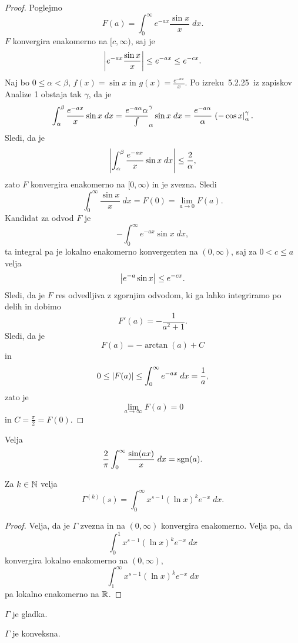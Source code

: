 \begin{proof}
Poglejmo
\[
F(a) = \int_0^\infty e^{-ax} \frac{\sin x}{x}\;dx.
\]
$F$ konvergira enakomerno na $[c,\infty)$, saj je
\[
\left\lvert e^{-ax} \frac{\sin x}{x}\right\rvert \leq e^{-ax} \leq e^{-cx}.
\]
Naj bo $0 \leq \alpha < \beta$, $f(x) = \sin x$ in
$g(x) = \frac{e^{-ax}}{x}$. Po izreku~5.2.25\ iz zapiskov Analize 1
obstaja tak $\gamma$, da je
\[
\int_\alpha^\beta \frac{e^{-ax}}{x} \sin x\;dx =
\frac{e^{-a\alpha}{\alpha}} \int_\alpha^\gamma \sin x\;dx =
\frac{e^{-a\alpha}}{\alpha} \left. (-\cos x\right|_{\alpha}^{\gamma}.
\]
Sledi, da je
\[
\left\lvert \int_\alpha^\beta \frac{e^{-ax}}{x} \sin x\;dx\right\rvert \leq
\frac{2}{\alpha},
\]
zato $F$ konvergira enakomerno na $[0,\infty)$ in je zvezna. Sledi
\[
\int_0^\infty \frac{\sin x}{x}\;dx = F(0) = \lim_{a \to 0} F(a).
\]
Kandidat za odvod $F$ je
\[
-\int_0^\infty e^{-ax} \sin x\;dx,
\]
ta integral pa je lokalno enakomerno konvergenten na $(0,\infty)$,
saj za $0 < c \leq a$ velja
\[
\left\lvert e^{-a} \sin x\right\rvert \leq e^{-cx}.
\]
Sledi, da je $F$ res odvedljiva z zgornjim odvodom, ki ga lahko
integriramo po delih in dobimo
\[
F'(a) = -\frac{1}{a^2 + 1}.
\]
Sledi, da je
\[
F(a) = -\arctan(a) + C
\]
in
\[
0 \leq \left\lvert F(a)\right\rvert \leq \int_0^\infty e^{-ax}\;dx = \frac{1}{a},
\]
zato je
\[
\lim_{a \to \infty} F(a) = 0
\]
in $C = \frac{\pi}{2} = F(0)$.
\end{proof}

\begin{posledica}
Velja
\[
\frac{2}{\pi} \int_0^\infty \frac{\sin (ax)}{x}\;dx = \operatorname{sgn}(a).
\]
\end{posledica}

\begin{trditev}
Za $k \in \mathbb{N}$ velja
\[
\Gamma^{(k)}(s) = \int_0^\infty x^{s-1} (\ln x)^k e^{-x}\;dx.
\]
\end{trditev}

\begin{proof}
Velja, da je $\Gamma$ zvezna in na $(0,\infty)$ konvergira
enakomerno. Velja pa, da
\[
\int_0^1 x^{s-1} (\ln x)^k e^{-x}\;dx
\]
konvergira lokalno enakomerno na $(0,\infty)$,
\[
\int_1^\infty x^{s-1} (\ln x)^k e^{-x}\;dx
\]
pa lokalno enakomerno na $\mathbb{R}$.
\end{proof}

\begin{posledica}
$\Gamma$ je gladka.
\end{posledica}

\begin{posledica}
$\Gamma$ je konveksna.
\end{posledica}

